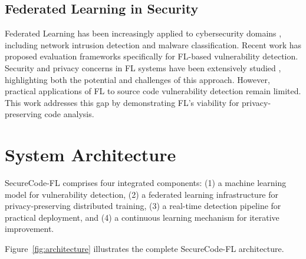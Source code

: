 \documentclass[conference]{IEEEtran}
\begin{document}
\subsection{Federated Learning in Security}

Federated Learning \cite{mcmahan2023fl, flower2024} has been increasingly applied to cybersecurity domains \cite{gao2024federated, nguyen2024flsecurity}, including network intrusion detection and malware classification. Recent work \cite{ding2024vulfl} has proposed evaluation frameworks specifically for FL-based vulnerability detection. Security and privacy concerns in FL systems have been extensively studied \cite{fang2024flattack}, highlighting both the potential and challenges of this approach. However, practical applications of FL to source code vulnerability detection remain limited. This work addresses this gap by demonstrating FL's viability for privacy-preserving code analysis.

\section{System Architecture}

SecureCode-FL comprises four integrated components: (1) a machine learning model for vulnerability detection, (2) a federated learning infrastructure for privacy-preserving distributed training, (3) a real-time detection pipeline for practical deployment, and (4) a continuous learning mechanism for iterative improvement.

Figure~\ref{fig:architecture} illustrates the complete SecureCode-FL architecture.
\end{document}
